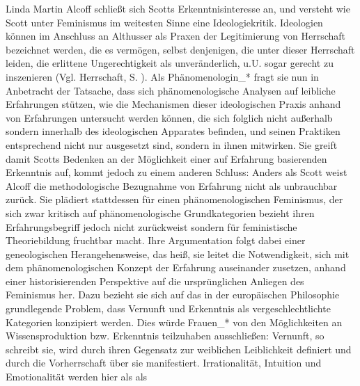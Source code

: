Linda Martin Alcoff schließt sich Scotts Erkenntnisinteresse an, und versteht
wie Scott unter Feminismus im weitesten Sinne eine Ideologiekritik. Ideologien
können im Anschluss an Althusser als Praxen der Legitimierung von Herrschaft
bezeichnet werden, die es vermögen, selbst denjenigen, die unter dieser
Herrschaft leiden, die erlittene Ungerechtigkeit als unveränderlich, u.U. sogar
gerecht zu inszenieren (Vgl. Herrschaft, S. ). Als Phänomenologin\_* fragt sie
nun in Anbetracht der Tatsache, dass sich phänomenologische Analysen auf
leibliche Erfahrungen stützen, wie die Mechanismen dieser ideologischen Praxis
anhand von Erfahrungen untersucht werden können, die sich folglich nicht
außerhalb sondern innerhalb des ideologischen Apparates befinden, und seinen
Praktiken entsprechend nicht nur ausgesetzt sind, sondern in ihnen mitwirken.
Sie greift damit Scotts Bedenken an der Möglichkeit einer auf Erfahrung
basierenden Erkenntnis auf, kommt jedoch zu einem anderen Schluss: Anders als
Scott weist Alcoff die methodologische Bezugnahme von Erfahrung nicht als
unbrauchbar zurück. Sie plädiert stattdessen für einen phänomenologischen
Feminismus, der sich zwar kritisch auf phänomenologische Grundkategorien
bezieht ihren Erfahrungsbegriff jedoch nicht zurückweist sondern für
feministische Theoriebildung fruchtbar macht.  Ihre Argumentation folgt dabei
einer geneologischen Herangehensweise, das heiß, sie leitet die Notwendigkeit,
sich mit dem phänomenologischen Konzept der Erfahrung auseinander zusetzen,
anhand einer historisierenden Perspektive auf die ursprünglichen Anliegen des
Feminismus her.  Dazu bezieht sie sich auf das in der europäischen Philosophie
grundlegende Problem, dass Vernunft und Erkenntnis als vergeschlechtlichte
Kategorien konzipiert werden. Dies würde Frauen\_* von den Möglichkeiten an
Wissensproduktion bzw. Erkenntnis teilzuhaben ausschließen: Vernunft, so
schreibt sie, wird durch ihren Gegensatz zur weiblichen Leiblichkeit definiert
und durch die Vorherrschaft über sie manifestiert. \footnotemark
{} Irrationalität, Intuition
und Emotionalität werden hier als als
